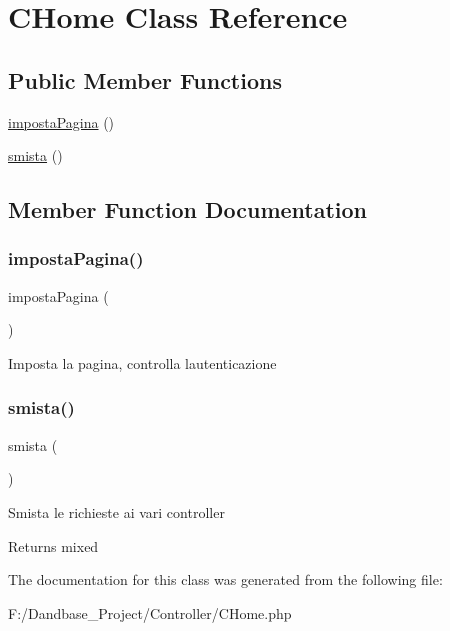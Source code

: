 \hypertarget{class_c_home}{}\section{C\+Home Class Reference}
\label{class_c_home}
\subsection*{Public Member Functions}
\begin{DoxyCompactItemize}
\item 
\mbox{\hyperlink{class_c_home_a711c4b2a5339ead56b3957d242895d96}{imposta\+Pagina}} ()
\item 
\mbox{\hyperlink{class_c_home_afc7ba180569cef3535974cfc4a1211f1}{smista}} ()
\end{DoxyCompactItemize}


\subsection{Member Function Documentation}
\mbox{\label{class_c_home_a711c4b2a5339ead56b3957d242895d96}} 
\subsubsection{\texorpdfstring{imposta\+Pagina()}{impostaPagina()}}
{\footnotesize\ttfamily imposta\+Pagina (\begin{DoxyParamCaption}{ }\end{DoxyParamCaption})}

Imposta la pagina, controlla l\textquotesingle{}autenticazione \mbox{\label{class_c_home_afc7ba180569cef3535974cfc4a1211f1}} 
\subsubsection{\texorpdfstring{smista()}{smista()}}
{\footnotesize\ttfamily smista (\begin{DoxyParamCaption}{ }\end{DoxyParamCaption})}

Smista le richieste ai vari controller

\begin{DoxyReturn}{Returns}
mixed 
\end{DoxyReturn}


The documentation for this class was generated from the following file\+:\begin{DoxyCompactItemize}
\item 
F\+:/\+Dandbase\+\_\+\+Project/\+Controller/C\+Home.\+php\end{DoxyCompactItemize}
